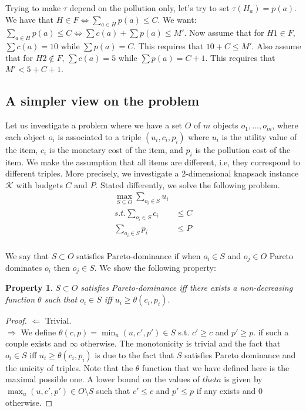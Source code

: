 \documentclass[version=3.21, pagesize, twoside=off, bibliography=totoc, DIV=calc, fontsize=12pt, a4paper, french, english]{scrartcl}
\newtheorem{property}{Property}
\begin{document}
Trying to make $τ$ depend on the pollution only, let’s try to set $τ(H_a) = p(a)$.
We have that $H \in F ⇔ \sum_{a \in H} p(a) ≤ C$. 
We want: $\sum_{a \in H} p(a) ≤ C ⇔ \sum c(a) + \sum p(a) ≤ M'$.
Now assume that for $H1 \in F$, $\sum c(a) = 10$ while $\sum p(a) = C$.
This requires that $10 + C ≤ M'$.
Also assume that for $H2 \notin F$, $\sum c(a) = 5$ while $\sum p(a) = C + 1$.
This requires that $M' < 5 + C + 1$.

\subsection{A simpler view on the problem}
Let us investigate a problem where we have a set $O$ of $m$ objects $o_1, \ldots, o_m$, where each object $o_i$ is associated to a triple $(u_i, c_i, p_i)$ where $u_i$ is the utility value of the item, $c_i$ is the monetary cost of the item, and $p_i$ is the pollution cost of the item. 
We make the assumption that all items are different, i.e, they correspond to different triples. 
More precisely, we investigate a $2$-dimensional knapsack instance $\mathcal{K}$ with budgets $C$ and $P$. 
Stated differently, we solve the following problem.
\begin{align}
\max_{S\subseteq O} \sum_{o_i \in S} u_i&\\
s.t.  \sum_{o_i \in S} c_i &\le C\\
 \sum_{o_i \in S} p_i &\le P\\
\end{align}

We say that $S\subset O$ satisfies Pareto-dominance if when $o_i \in S$ and $o_j \in O$ Pareto dominates $o_i$ then $o_j \in S$.
We show the following property: 
\begin{property}
$S\subset O$ satisfies Pareto-dominance iff there exists a non-decreasing function $\theta$ such that $o_i\in S$ iff $u_i \ge \theta(c_i,p_i)$.
\end{property}
\begin{proof}
$\Leftarrow$ Trivial.\\
$\Rightarrow$ We define $\theta(c,p) = \min_{u} (u,c',p')\in S$ s.t. $c'\ge c$ and $p'\ge p$. if such a couple exists and $\infty$ otherwise. The monotonicity is trivial and the fact that $o_i\in S$ iff $u_i \ge \theta(c_i,p_i)$ is due to the fact that $S$ satisfies Pareto dominance and the unicity of triples. Note that the $\theta$ function that we have defined here is the maximal possible one. A lower bound on the values of $theta$ is given by $\max_u (u,c',p')\in O\setminus S$ such that $c'\le c$ and $p'\le p$ if any exists and $0$ otherwise.  
\end{proof}
\end{document}
